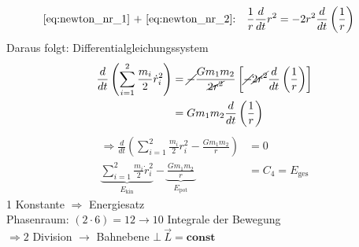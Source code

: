 \begin{description}
\begin{align}
            \text{\autoref{eq:newton_nr_1} + \autoref{eq:newton_nr_2}:}\quad \frac{1}{r} \frac{d}{dt} r^2 &= -2r^2 \frac{d}{dt}\left(\frac{1}{r}\right)
        \end{align}
        \color{black}
        Daraus folgt: Differentialgleichungssystem
        \begin{align*}
            \frac{d}{dt}\left(\sum\limits_{i=1}^{2} \frac{m_i}{2} \dot r^2_i\right) &= \cancel{-}\frac{Gm_1m_2}{\cancel{2r^2}} \left[\cancel{-}\cancel{2r^2}\frac{d}{dt} \left(\frac{1}{r}\right)\right]\\
                                &= Gm_1m_2 \frac{d}{dt} \left(\frac{1}{r}\right)
        \end{align*}
        \begin{align*}
            \Rightarrow \frac{d}{dt} \left(\sum_{i = 1}^{2} \frac{m_i}{2} r_i^2 - \frac{Gm_1m_2}{r}\right) &= 0 \tag{s. dd}\\
            \underbrace{\sum\limits_{i = 1}^2 \frac{m_i}{2} \dot{r}_i^2}_{E_{\text{kin}}} - \underbrace{\frac{Gm_1m_2}{r}}_{E_{\text{pot}}} &= C_4 = E_{\text{ges}}
        \end{align*}   
        1 Konstante $\Rightarrow$ Energiesatz \\
        Phasenraum: $(2 \cdot 6) = 12 \rightarrow 10$ Integrale der Bewegung\\
        $\Rightarrow 2$ Division $\rightarrow$ Bahnebene $\bot\ \vec L = \mathbf{const}$
\end{description}
